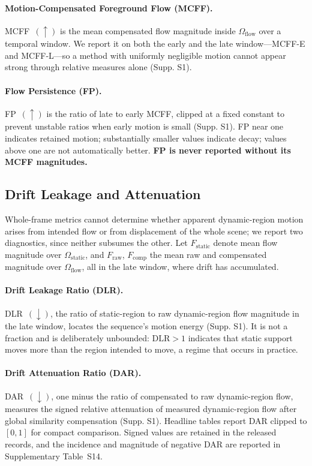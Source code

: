\paragraph{Motion-Compensated Foreground Flow (MCFF).}
MCFF~$(\uparrow)$ is the mean compensated flow magnitude inside $\Omega_{\mathrm{flow}}$ over a temporal window. We report it on both the early and the late window---MCFF-E and MCFF-L---so a method with uniformly negligible motion cannot appear strong through relative measures alone (Supp. S1).

\paragraph{Flow Persistence (FP).}
FP~$(\uparrow)$ is the ratio of late to early MCFF, clipped at a fixed constant to prevent unstable ratios when early motion is small (Supp. S1). FP near one indicates retained motion; substantially smaller values indicate decay; values above one are not automatically better. \textbf{FP is never reported without its MCFF magnitudes.}

\subsection{Drift Leakage and Attenuation}
\label{sec:drift_leakage}
Whole-frame metrics cannot determine whether apparent dynamic-region motion arises from intended flow or from displacement of the whole scene; we report two diagnostics, since neither subsumes the other. Let $F_{\mathrm{static}}$ denote mean flow magnitude over $\Omega_{\mathrm{static}}$, and $F_{\mathrm{raw}}$, $F_{\mathrm{comp}}$ the mean raw and compensated magnitude over $\Omega_{\mathrm{flow}}$, all in the late window, where drift has accumulated.

\paragraph{Drift Leakage Ratio (DLR).}
DLR~$(\downarrow)$, the ratio of static-region to raw dynamic-region flow magnitude in the late window, locates the sequence's motion energy (Supp. S1). It is not a fraction and is deliberately unbounded: $\mathrm{DLR}>1$ indicates that static support moves more than the region intended to move, a regime that occurs in practice.

\paragraph{Drift Attenuation Ratio (DAR).}
DAR~$(\downarrow)$, one minus the ratio of compensated to raw dynamic-region flow, measures the signed relative attenuation of measured dynamic-region flow after global similarity compensation (Supp. S1). Headline tables report DAR clipped to $[0,1]$ for compact comparison. Signed values are retained in the released records, and the incidence and magnitude of negative DAR are reported in Supplementary Table~S14.

